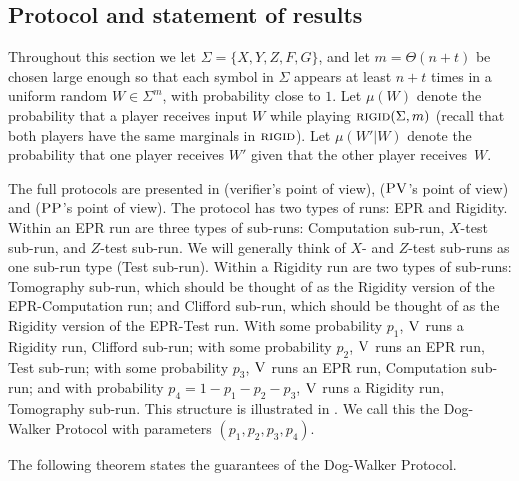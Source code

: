 \documentclass{toc}
\newcommand{\rigid}{\textsc{rigid}}
\newcommand{\ver}{\textsc{V}}
\newcommand{\pv}{\textsc{PV}}
\newcommand{\pp}{\textsc{PP}}
\begin{document}
\subsection{Protocol and statement of results}


Throughout this section we 
let $\Sigma=\{X,Y,Z,F,G\}$, and let $m=\Theta(n+t)$ be chosen 
large enough so that each symbol in $\Sigma$ appears at least $n+t$ times in a uniform random $W\in\Sigma^m$, with probability close to $1$.
Let $\mu({W})$ denote the probability that a player receives input ${W}$ while playing $\rigid(\Sigma,m)$ (recall that both players have the same marginals in $\rigid$). Let $\mu({W}'|{W})$ denote the probability that one player receives ${W}'$ given that the other player receives~${W}$. 

The full protocols are presented in  (verifier's point of view),  ($\pv$'s point of view) and  ($\pp$'s point of view). The protocol has two 
types of runs: 
EPR and Rigidity. Within an EPR run are three 
types of sub-runs: 
Computation sub-run, $X$-test sub-run, and $Z$-test sub-run. We will generally think of $X$- and $Z$-test sub-runs as one sub-run type (Test sub-run). Within a Rigidity run are two types of sub-runs: Tomography sub-run, which should be thought of as the Rigidity version of the EPR-Computation run; and Clifford sub-run, which should be thought of as the Rigidity version of the EPR-Test run. With some probability $p_1$, $\ver$ runs a Rigidity run, Clifford sub-run; with some probability $p_2$, $\ver$ runs an EPR run, Test sub-run; with some probability $p_3$, $\ver$ runs an EPR run, Computation sub-run; and with probability $p_4=1-p_1-p_2-p_3$, $\ver$ runs a Rigidity run, Tomography sub-run. This structure is illustrated in . We call this the Dog-Walker Protocol with parameters $(p_1,p_2,p_3,p_4)$.



The following theorem states the guarantees of the Dog-Walker Protocol.
\end{document}

